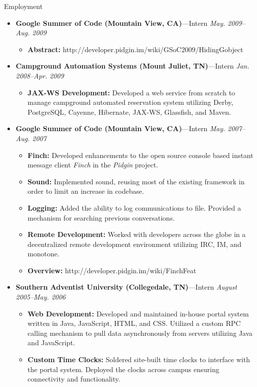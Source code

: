 \documentclass[11pt,oneside]{article}
\newenvironment{ressection}[1]{
	\vspace{4pt}
	{\fontfamily{phv}\selectfont\Large#1}
	\begin{itemize}
	\vspace{3pt}
}{
	\end{itemize}
}
\newcommand{\ressubitem}[1]{
	\vspace{-1pt}
	\item \begin{flushleft} #1 \end{flushleft}
}
\newcommand{\resbigitem}[3]{
	\vspace{-5pt}
	\item
	{\textbf{#1}---#2 \hfill \textit{#3}}
}
\newenvironment{restitledposition}[3]{
	\resbigitem{#1}{#2}{#3}
	\vspace{-2pt}
	\begin{itemize}
}{
	\end{itemize}
}
\begin{document}
\begin{ressection}{Employment}
\begin{restitledposition}{Google Summer of Code (Mountain View, CA)}{Intern}{May. 2009--Aug. 2009}
		\ressubitem{\textbf{Abstract:} http://developer.pidgin.im/wiki/GSoC2009/HidingGobject}

	\end{restitledposition}

	\begin{restitledposition}{Campground Automation Systems (Mount Juliet, TN)}{Intern}{Jan. 2008--Apr. 2009}

    \ressubitem{\textbf{JAX-WS Development:} Developed a web service from scratch to
		manage campground automated reservation system utilizing Derby, PostgreSQL, 
		Cayenne, Hibernate, JAX-WS, Glassfish, and Maven.}
		
	\end{restitledposition}

	\begin{restitledposition}{Google Summer of Code (Mountain View, CA)}{Intern}{May. 2007--Aug. 2007}

		\ressubitem{\textbf{Finch:} Developed enhancements to the open source console
		based instant message client \textit{Finch} in the \textit{Pidgin} project.}

		\ressubitem{\textbf{Sound:} Implemented sound, reusing most of the existing
		framework in order to limit an increase in codebase.}

		\ressubitem{\textbf{Logging:} Added the ability to log communications to file. 
		Provided a mechanism for searching previous conversations.}

		\ressubitem{\textbf{Remote Development:} Worked with developers across the globe in
		a decentralized remote development environment utilizing IRC, IM, and monotone.}

		\ressubitem{\textbf{Overview:} http://developer.pidgin.im/wiki/FinchFeat}
		
	\end{restitledposition}

	\begin{restitledposition}{Southern Adventist University (Collegedale, TN)}{Intern}{August 2005--May. 2006}

	\ressubitem{\textbf{Web Development:} Developed and maintained
	in-house portal system written in Java, JavaScript, HTML, and CSS.
	Utilized a custom RPC calling mechanism	to pull data asynchronously
	from servers utilizing Java and JavaScript.}

	\ressubitem{\textbf{Custom Time Clocks:} Soldered site-built time clocks to
	interface with the portal system.  Deployed the clocks across campus ensuring
	connectivity and functionality.}


\end{restitledposition}
\end{ressection}
\end{document}
